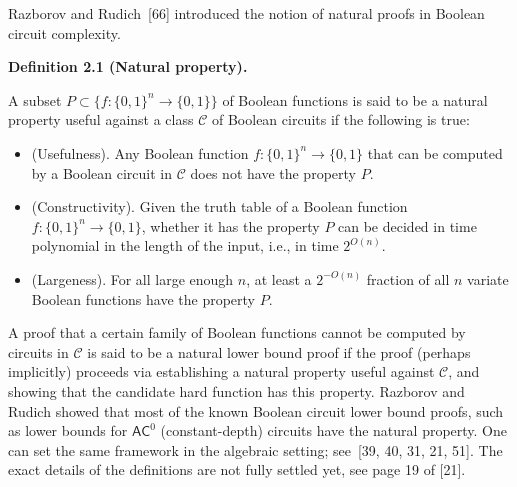 Razborov and Rudich [66] introduced the notion of natural proofs in Boolean circuit complexity.





\par\medskip\noindent\textbf{Definition 2.1 (Natural property).}\par



A subset $P\subset\{f:\{0,1\}^{n}\rightarrow\{0,1\}\}$ of Boolean functions is said to be a natural property useful against a class $\mathcal{C}$ of Boolean circuits if the following is true:



\begin{itemize}


\item 
 


(Usefulness). Any Boolean function $f:\{0,1\}^{n}\rightarrow\{0,1\}$ that can be computed by a Boolean circuit in $\mathcal{C}$ does not have the property $P$.





\item 
 


(Constructivity). Given the truth table of a Boolean function $f:\{0,1\}^{n}\rightarrow\{0,1\}$, whether it has the property $P$ can be decided in time polynomial in the length of the input, i.e., in time $2^{O(n)}$.





\item 
 


(Largeness). For all large enough $n$, at least a $2^{-O(n)}$ fraction of all $n$ variate Boolean functions have the property $P$.





\end{itemize}





A proof that a certain family of Boolean functions cannot be computed by circuits in $\mathcal{C}$ is said to be a natural lower bound proof if the proof (perhaps implicitly) proceeds via establishing a natural property useful against $\mathcal{C}$, and showing that the candidate hard function has this property.
Razborov and Rudich showed that most of the known Boolean circuit lower bound proofs, such as lower bounds for $\mathsf{AC}^{0}$ (constant-depth) circuits have the natural property.
One can set the same framework in the algebraic setting; see [39, 40, 31, 21, 51]. The exact details of the definitions are not fully settled yet, see page 19 of [21].





